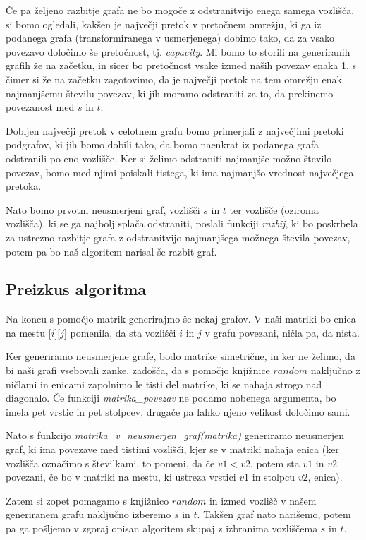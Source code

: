 \documentclass[a4paper,12pt]{article}
\theoremstyle{definition}
\begin{document}
Če pa željeno razbitje grafa ne bo mogoče z odstranitvijo enega samega vozlišča,
si bomo ogledali, kakšen je največji pretok v pretočnem omrežju, ki ga iz podanega
grafa (transformiranega v usmerjenega) dobimo tako, da za vsako povezavo določimo 
še pretočnost, tj. \textit{capacity}. Mi bomo to storili na generiranih grafih 
že na začetku, in sicer bo pretočnost vsake izmed naših povezav enaka 1, 
s čimer si že na začetku zagotovimo,
da je največji pretok na tem omrežju enak najmanjšemu številu povezav, ki jih moramo
odstraniti za to, da prekinemo povezanost med $s$ in $t$.

Dobljen največji pretok v celotnem grafu bomo primerjali z največjimi pretoki podgrafov,
ki jih bomo dobili tako, da bomo naenkrat iz podanega grafa odstranili po eno vozlišče.
Ker si želimo odstraniti najmanjše možno število povezav, bomo med njimi poiskali tistega,
ki ima najmanjšo vrednost največjega pretoka.

Nato bomo prvotni neusmerjeni graf, vozlišči $s$ in $t$ ter vozlišče (oziroma vozlišča), 
ki se ga najbolj splača odstraniti, poslali funkciji \textit{razbij}, ki bo poskrbela
za ustrezno razbitje grafa z odstranitvijo najmanjšega možnega števila povezav, potem pa
bo naš algoritem narisal še razbit graf.

\subsection{Preizkus algoritma}

Na koncu s pomočjo matrik generirajmo še nekaj grafov.
V naši matriki bo enica na mestu [$i$][$j$] pomenila, da sta vozlišči $i$ in $j$
v grafu povezani, ničla pa, da nista.

Ker generiramo neusmerjene grafe, bodo matrike simetrične, in ker ne želimo,
da bi naši grafi vsebovali zanke, zadošča, da s pomočjo knjižnice $random$ 
naključno z ničlami in enicami zapolnimo le tisti del matrike, ki se nahaja
strogo nad diagonalo. 
Če funkciji \textit{matrika\_povezav} ne podamo nobenega argumenta, 
bo imela pet vrstic in pet stolpcev,
drugače pa lahko njeno velikost določimo sami. 

Nato s funkcijo \textit{matrika\_v\_neusmerjen\_graf(matrika)} generiramo
neusmerjen graf, ki ima povezave med tistimi vozlišči, kjer se v matriki 
nahaja enica (ker vozlišča označimo s številkami, to pomeni, da če $v1 < v2$,
potem sta $v1$ in $v2$ povezani, če bo v matriki na mestu, ki ustreza 
vrstici $v1$ in stolpcu $v2$, enica).

Zatem si zopet pomagamo s knjižnico $random$ in izmed vozlišč v našem generiranem grafu
naključno izberemo $s$ in $t$. Takšen graf nato narišemo, potem pa ga pošljemo v
zgoraj opisan algoritem skupaj z izbranima vozliščema $s$ in $t$.
\end{document}
